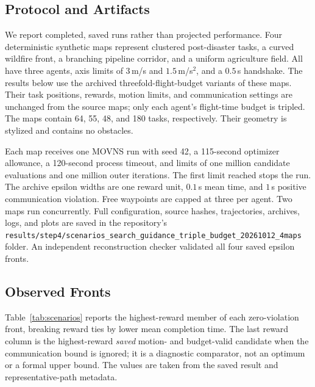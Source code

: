 \subsection{Protocol and Artifacts}
We report completed, saved runs rather than projected performance. Four deterministic synthetic maps represent clustered post-disaster tasks, a curved wildfire front, a branching pipeline corridor, and a uniform agriculture field. All have three agents, axis limits of $3\,$m/s and $1.5\,$m/s$^2$, and a $0.5\,$s handshake. The results below use the archived threefold-flight-budget variants of these maps. Their task positions, rewards, motion limits, and communication settings are unchanged from the source maps; only each agent's flight-time budget is tripled. The maps contain 64, 55, 48, and 180 tasks, respectively. Their geometry is stylized and contains no obstacles.

Each map receives one MOVNS run with seed 42, a 115-second optimizer allowance, a 120-second process timeout, and limits of one million candidate evaluations and one million outer iterations. The first limit reached stops the run. The archive epsilon widths are one reward unit, $0.1\,$s mean time, and $1\,$s positive communication violation. Free waypoints are capped at three per agent. Two maps run concurrently. Full configuration, source hashes, trajectories, archives, logs, and plots are saved in the repository's \texttt{results/step4/scenarios\_search\_guidance\_triple\_budget\_20261012\_4maps} folder. An independent reconstruction checker validated all four saved epsilon fronts.

\subsection{Observed Fronts}
Table~\ref{tab:scenarios} reports the highest-reward member of each zero-violation front, breaking reward ties by lower mean completion time. The last reward column is the highest-reward \emph{saved} motion- and budget-valid candidate when the communication bound is ignored; it is a diagnostic comparator, not an optimum or a formal upper bound. The values are taken from the saved result and representative-path metadata.

\begin{table}[t]
\centering
\caption{Single-seed, 115-second searches on threefold-flight-budget maps. $Q_f$ is the best saved $T_c$-feasible reward and $Q_b$ the best saved budget-only reward.}
\label{tab:scenarios}
\end{table}

